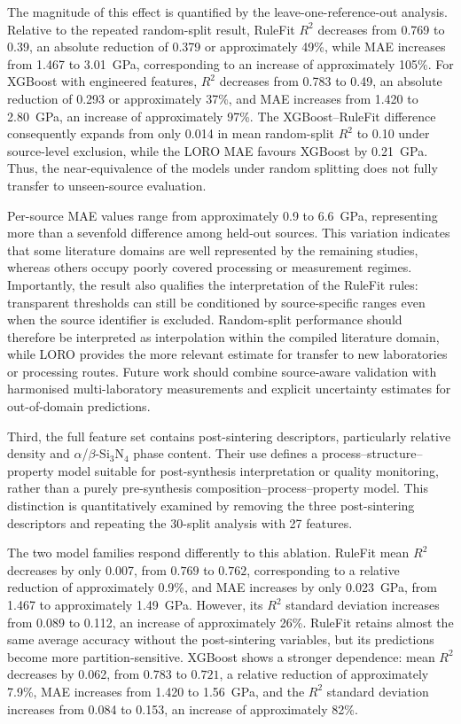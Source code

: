\documentclass[pdflatex,sn-mathphys-num]{sn-jnl}%
\newif\ifrevmarks%
\newcommand{\revmark}[1]{\ifrevmarks\textcolor{revblue}{#1}\else#1\fi}%
\theoremstyle{thmstyleone}%
\theoremstyle{thmstyletwo}%
\theoremstyle{thmstylethree}%
\begin{document}
The magnitude of this effect is quantified by the leave-one-reference-out analysis. Relative to the repeated random-split result, RuleFit $R^2$ decreases from 0.769 to 0.39, an absolute reduction of 0.379 or approximately 49\%, while MAE increases from 1.467 to 3.01~GPa, corresponding to an increase of approximately 105\%. For XGBoost with engineered features, $R^2$ decreases from 0.783 to 0.49, an absolute reduction of 0.293 or approximately 37\%, and MAE increases from 1.420 to 2.80~GPa, an increase of approximately 97\%. The XGBoost--RuleFit difference consequently expands from only 0.014 in mean random-split $R^2$ to 0.10 under source-level exclusion, while the LORO MAE favours XGBoost by 0.21~GPa. Thus, the near-equivalence of the models under random splitting does not fully transfer to unseen-source evaluation.

Per-source MAE values range from approximately 0.9 to 6.6~GPa, representing more than a sevenfold difference among held-out sources. This variation indicates that some literature domains are well represented by the remaining studies, whereas others occupy poorly covered processing or measurement regimes. Importantly, the result also qualifies the interpretation of the RuleFit rules: transparent thresholds can still be conditioned by source-specific ranges even when the source identifier is excluded. Random-split performance should therefore be interpreted as interpolation within the compiled literature domain, while LORO provides the more relevant estimate for transfer to new laboratories or processing routes. Future work should combine source-aware validation with harmonised multi-laboratory measurements and explicit uncertainty estimates for out-of-domain predictions.

Third, the full feature set contains post-sintering descriptors, particularly relative density and $\alpha$/$\beta$-Si$_3$N$_4$ phase content. Their use defines a process--structure--property model suitable for post-synthesis interpretation or quality monitoring, rather than a purely pre-synthesis composition--process--property model. This distinction is quantitatively examined by removing the three post-sintering descriptors and repeating the 30-split analysis with 27 features.

\revmark{The two model families respond differently to this ablation. RuleFit mean $R^2$ decreases by only 0.007, from $0.769$ to $0.762$, corresponding to a relative reduction of approximately 0.9\%, and MAE increases by only 0.023~GPa, from 1.467 to approximately 1.49~GPa. However, its $R^2$ standard deviation increases from 0.089 to 0.112, an increase of approximately 26\%. RuleFit retains almost the same average accuracy without the post-sintering variables, but its predictions become more partition-sensitive. XGBoost shows a stronger dependence: mean $R^2$ decreases by 0.062, from $0.783$ to $0.721$, a relative reduction of approximately 7.9\%, MAE increases from 1.420 to 1.56~GPa, and the $R^2$ standard deviation increases from 0.084 to 0.153, an increase of approximately 82\%.}
\end{document}
